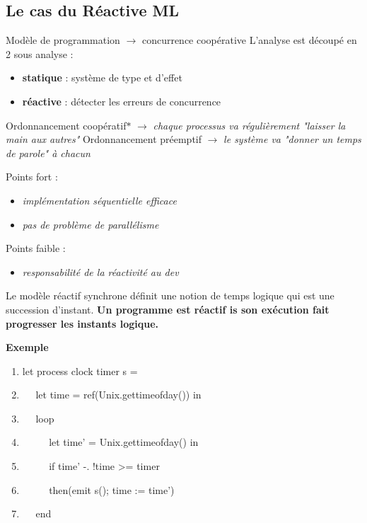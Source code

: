 \documentclass[10pt,a4paper]{article}
\begin{document}
		\subsection{Le cas du Réactive ML}
				Modèle de programmation $\longrightarrow$ concurrence coopérative 
				\smallbreak
				L'analyse est découpé en 2 sous analyse :
				\begin{itemize}
					\item \textbf{statique} : système de type et d'effet
					\item \textbf{réactive} : détecter les erreurs de concurrence
				\end{itemize}
				\bigbreak
			
			
				Ordonnancement coopératif$\ast$ $\longrightarrow$ \textit{\small{chaque processus va r\'{e}guli\`{e}rement "laisser la main aux autres"}}
				\smallbreak
				Ordonnancement pr\'{e}emptif $\longrightarrow$ \textit{\small{le syst\`{e}me va "donner un temps de parole" \`{a} chacun}}
				\medbreak
				
				Points fort :
				\begin{itemize}
					\item \textit{\small{impl\'{e}mentation s\'{e}quentielle efficace}}
					\item \textit{\small{pas de probl\`{e}me de parall\'{e}lisme}}
				\end{itemize}
				\medbreak
				
				Points faible : 
				\begin{itemize}
					\item \textit{\small{responsabilit\'{e} de la r\'{e}activit\'{e} au dev}}
				\end{itemize}
				\medbreak
				
				Le mod\`{e}le r\'{e}actif synchrone d\'{e}finit une notion de temps logique qui est une succession d'instant.
				\smallbreak
				\textbf{
					Un programme est r\'{e}actif is son ex\'{e}cution fait progresser les instants logique.
				}
				\medbreak
				
				\textbf{Exemple}
				\medbreak
				
				\begin{enumerate}
				 	\item let process clock timer s =
				 	\item $\quad$ let time = ref(Unix.gettimeofday()) in
				 	\item $\quad$ loop
				 	\item $\quad$ $\quad$ let time' = Unix.gettimeofday() in
				 	\item $\quad$ $\quad$ if time' -. !time >= timer
				 	\item $\quad$ $\quad$ then(emit s(); time := time')
				 	\item $\quad$ end 
				\end{enumerate}
				\medbreak
				
\end{document}
